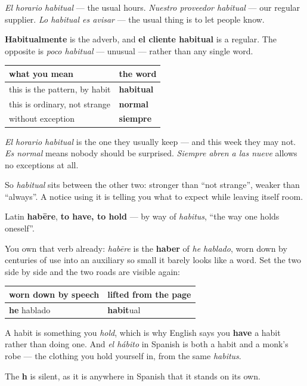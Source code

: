 \emph{El horario habitual} — the usual hours. \emph{Nuestro proveedor habitual} — our regular supplier. \emph{Lo habitual es avisar} — the usual thing is to let people know.

\textbf{Habitualmente} is the adverb, and \textbf{el cliente habitual} is a regular. The opposite is \emph{poco habitual} — unusual — rather than any single word.

\begin{grammarlens}[title={Grammar Lens: habitual, normal, siempre}]
\noindent
\begin{tabularx}{\linewidth}{@{}>{\raggedright\arraybackslash}X>{\raggedright\arraybackslash}X@{}}
\toprule
\textbf{what you mean} & \textbf{the word} \\
\midrule
this is the pattern, by habit & \textbf{habitual} \\
this is ordinary, not strange & \textbf{normal} \\
without exception & \textbf{siempre} \\
\bottomrule
\end{tabularx}

\emph{El horario habitual} is the one they usually keep — and this week they may not. \emph{Es normal} means nobody should be surprised. \emph{Siempre abren a las nueve} allows no exceptions at all.

So \emph{habitual} sits between the other two: stronger than \textquotedblleft{}not strange\textquotedblright{}, weaker than \textquotedblleft{}always\textquotedblright{}. A notice using it is telling you what to expect while leaving itself room.
\end{grammarlens}

\begin{cousinweb}
Latin \textbf{habēre}, \textbf{to have, to hold} — by way of \emph{habitus}, \textquotedblleft{}the way one holds oneself\textquotedblright{}.

You own that verb already: \emph{habēre} is the \textbf{haber} of \emph{he hablado}, worn down by centuries of use into an auxiliary so small it barely looks like a word. Set the two side by side and the two roads are visible again:

\noindent
\begin{tabularx}{\linewidth}{@{}>{\raggedright\arraybackslash}X>{\raggedright\arraybackslash}X@{}}
\toprule
\textbf{worn down by speech} & \textbf{lifted from the page} \\
\midrule
\textbf{he} hablado & \textbf{habit}ual \\
\bottomrule
\end{tabularx}

A habit is something you \emph{hold}, which is why English says you \textbf{have} a habit rather than doing one. And \emph{el hábito} in Spanish is both a habit and a monk's robe — the clothing you hold yourself in, from the same \emph{habitus}.

The \textbf{h} is silent, as it is anywhere in Spanish that it stands on its own.
\end{cousinweb}

